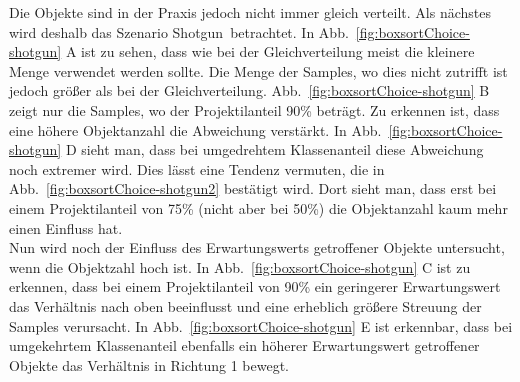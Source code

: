 Die Objekte sind in der Praxis jedoch nicht immer gleich verteilt. Als nächstes wird deshalb das Szenario \glqq Shotgun\grqq ~betrachtet. In Abb.~\ref{fig:boxsortChoice-shotgun} A ist zu sehen, dass wie bei der Gleichverteilung meist die kleinere Menge verwendet werden sollte. Die Menge der Samples, wo dies nicht zutrifft ist jedoch größer als bei der Gleichverteilung. Abb.~\ref{fig:boxsortChoice-shotgun} B zeigt nur die Samples, wo der Projektilanteil 90\% beträgt. Zu erkennen ist, dass eine höhere Objektanzahl die Abweichung verstärkt. In Abb.~\ref{fig:boxsortChoice-shotgun} D sieht man, dass bei umgedrehtem Klassenanteil diese Abweichung noch extremer wird. Dies lässt eine Tendenz vermuten, die in Abb.~\ref{fig:boxsortChoice-shotgun2} bestätigt wird. Dort sieht man, dass erst bei einem Projektilanteil von 75\% (nicht aber bei 50\%) die Objektanzahl kaum mehr einen Einfluss hat.\\
Nun wird noch der Einfluss des Erwartungswerts getroffener Objekte untersucht, wenn die Objektzahl hoch ist. In Abb.~\ref{fig:boxsortChoice-shotgun} C ist zu erkennen, dass bei einem Projektilanteil von 90\% ein geringerer Erwartungswert das Verhältnis nach oben beeinflusst und eine erheblich größere Streuung der Samples verursacht. In Abb.~\ref{fig:boxsortChoice-shotgun} E ist erkennbar, dass bei umgekehrtem Klassenanteil ebenfalls ein höherer Erwartungswert getroffener Objekte das Verhältnis in Richtung 1 bewegt.\\


